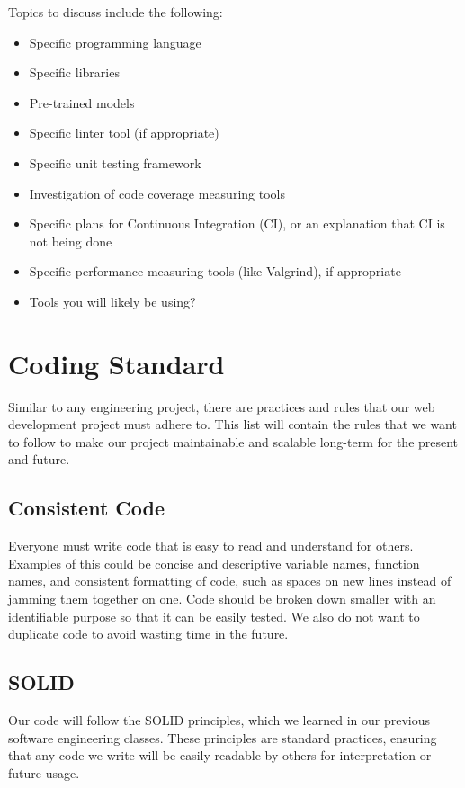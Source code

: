 \documentclass{article}
\begin{document}
Topics to discuss include the following:

\begin{itemize}
\item Specific programming language
\item Specific libraries
\item Pre-trained models
\item Specific linter tool (if appropriate)
\item Specific unit testing framework
\item Investigation of code coverage measuring tools
\item Specific plans for Continuous Integration (CI), or an explanation that CI
  is not being done
\item Specific performance measuring tools (like Valgrind), if
  appropriate
\item Tools you will likely be using?
\end{itemize}


\section{Coding Standard}

Similar to any engineering project, there are practices and rules that our web development project must adhere to. This list will contain the rules that we want to follow to make our project maintainable and scalable long-term for the present and future.

\subsection*{Consistent Code}

Everyone must write code that is easy to read and understand for others. Examples of this could be concise and descriptive variable names, function names, and consistent formatting of code, such as spaces on new lines instead of jamming them together on one. Code should be broken down smaller with an identifiable purpose so that it can be easily tested. We also do not want to duplicate code to avoid wasting time in the future.

\subsection*{SOLID}

Our code will follow the SOLID principles, which we learned in our previous software engineering classes. These principles are standard practices, ensuring that any code we write will be easily readable by others for interpretation or future usage.
\end{document}
